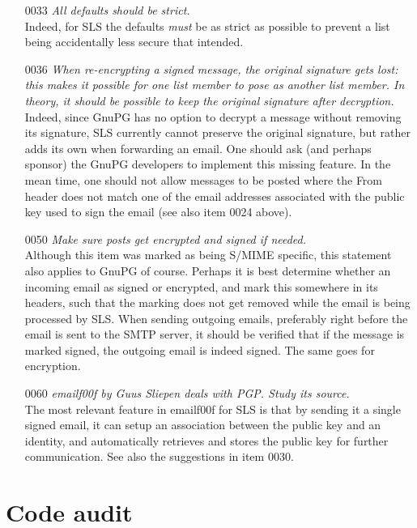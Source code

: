 \documentclass[a4]{article}
\begin{document}
\begin{enumerate}
\item[0033]\textit{All defaults should be strict.}
\\
Indeed, for SLS the defaults {\em must} be as strict as possible
to prevent a list being accidentally less secure that intended.

\item[0036]\textit{When re-encrypting a signed message, the original signature
  gets lost: this makes it possible for one list member to pose as another list
  member. In theory, it should be possible to keep the original signature after
  decryption.}
\\
Indeed, since GnuPG has no option to decrypt a message without removing its signature,
SLS currently cannot preserve the original signature, but rather adds its own when forwarding an email.
One should ask (and perhaps sponsor) the GnuPG developers to implement this missing feature.
In the mean time, one should not allow messages to be posted where the From header does not match one of the email addresses associated with the public key used to sign the email (see also item 0024 above).

\item[0050]\textit{Make sure posts get encrypted and signed if needed.}
\\
Although this item was marked as being S/MIME specific, this statement also applies to GnuPG of course.
Perhaps it is best determine whether an incoming email as signed or encrypted, and mark this somewhere in its headers, such that the marking does not get removed while the email is being processed by SLS.
When sending outgoing emails, preferably right before the email is sent to the SMTP server,
it should be verified that if the message is marked signed, the outgoing email is indeed signed.
The same goes for encryption.

\item[0060]\textit{emailf00f by Guus Sliepen deals with PGP. Study its source.}
\\
The most relevant feature in emailf00f for SLS is that by sending it a single signed email,
it can setup an association between the public key and an identity,
and automatically retrieves and stores the public key for further communication.
See also the suggestions in item 0030.
\end{enumerate}

\section{Code audit}
\end{document}
